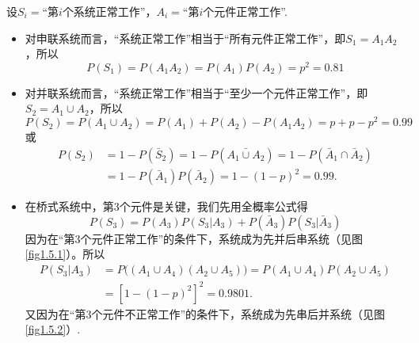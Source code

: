 \begin{solution}
    设$S_i=$“第$i$个系统正常工作”，$A_i=$“第$i$个元件正常工作”.
    \begin{itemize}[(1)]
        \item 对申联系统而言，“系统正常工作”相当于“所有元件正常工作”，即$S_1=A_1A_2$，所以
              \[ P(S_1) = P(A_1A_2) = P(A_1)P(A_2) = p^2 = 0.81 \]
        \item 对并联系统而言，“系统正常工作”相当于“至少一个元件正常工作”，即$S_2=A_1\cup A_2$，所以
              \[ P(S_2) = P(A_1\cup A_2) = P(A_1) + P(A_2) - P(A_1A_2)= p + p - p^2 = 0.99 \]
              或
              \begin{align*}
                  P(S_2) & = 1 - P(\bar S_2) = 1 - P(\bar{A_1\cup A_2}) = 1 - P(\bar A_1\cap \bar A_2) \\
                         & = 1 - P(\bar A_1)P(\bar A_2) = 1 - (1-p)^2 = 0.99.
              \end{align*}
        \item 在桥式系统中，第3个元件是关键，我们先用全概率公式得
              \[ P(S_3) = P(A_3)P(S_3|A_3) + P(\bar A_3)P(S_3|\bar A_3) \]
              因为在“第3个元件正常工作”的条件下，系统成为先并后串系统（见图 \ref{fig1.5.1}）。所以
              \begin{align*}
                  P(S_3|A_3) & = P\big( ( A_1\cup A_4 )(A_2 \cup A_5) \big) = P(A_1\cup A_4)P(A_2\cup A_5) \\
                             & = [ 1 - (1-p)^2 ]^2 = 0.9801.
              \end{align*}
              又因为在“第3个元件不正常工作”的条件下，系统成为先串后并系统（见图 \ref{fig1.5.2}）.
    \end{itemize}
    \begin{figure}[!ht]
        \centering
        \begin{minipage}{0.48\linewidth}
            \centering
\end{minipage}
\end{figure}
\end{solution}

